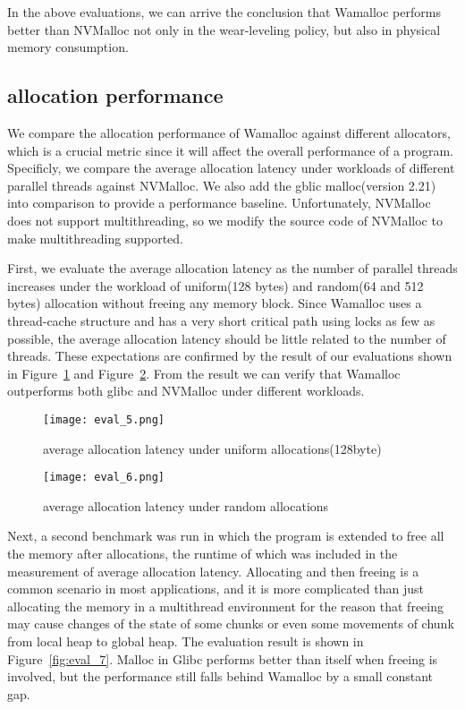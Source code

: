 \documentclass[10pt, conference, compsocconf]{IEEEtran}
\begin{document}
In the above evaluations, we can arrive the conclusion that
Wamalloc performs better than NVMalloc not only in the wear-leveling policy,
but also in physical memory consumption.

\subsection{allocation performance}

We compare the allocation performance of Wamalloc against different allocators,
which is a crucial metric since it will affect the overall performance of a program.
Specificly, we compare the average allocation latency under workloads of different parallel threads against NVMalloc.
We also add the gblic malloc(version 2.21) into comparison to provide a performance baseline.
Unfortunately, NVMalloc does not support multithreading,
so we modify the source code of NVMalloc to make multithreading supported.

First, we evaluate the average allocation latency as the number of parallel threads increases
under the workload of uniform(128 bytes) and random(64 and 512 bytes) allocation without freeing any memory block.
Since Wamalloc uses a thread-cache structure and has a very short critical path using locks as few as possible,
the average allocation latency should be little related to the number of threads.
These expectations are confirmed by the result of our evaluations shown in Figure~\ref{fig:eval_5} and Figure~\ref{fig:eval_6}.
From the result we can verify that Wamalloc outperforms both glibc and NVMalloc under different workloads.


\begin{figure}[t]
\centering
\texttt{[image: eval\_5.png]}
\caption{average allocation latency under uniform allocations(128byte)}
\label{fig:eval_5}
\end{figure}

\begin{figure}[t]
\centering
\texttt{[image: eval\_6.png]}
\caption{average allocation latency under random allocations}
\label{fig:eval_6}
\end{figure}

Next, a second benchmark was run in which the program is extended to free all the memory after allocations, 
the runtime of which was included in the measurement of average allocation latency.
Allocating and then freeing is a common scenario in most applications, 
and it is more complicated than just allocating the memory in a multithread environment 
for the reason that freeing may cause changes of the state of some chunks or even some movements of chunk from local heap to global heap.
The evaluation result is shown in Figure~\ref{fig:eval_7}.
Malloc in Glibc performs better than itself when freeing is involved, 
but the performance still falls behind Wamalloc by a small constant gap.
\end{document}

